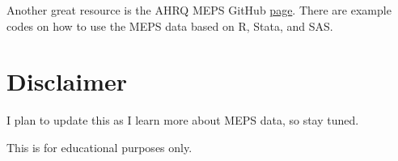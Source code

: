 \documentclass[
]{book}
\begin{document}
Another great resource is the AHRQ MEPS GitHub \href{https://github.com/HHS-AHRQ/MEPS}{page}. There are example codes on how to use the MEPS data based on R, Stata, and SAS.

\hypertarget{disclaimer}{%
\section{Disclaimer}\label{disclaimer}}

I plan to update this as I learn more about MEPS data, so stay tuned.

This is for educational purposes only.

  
\end{document}
